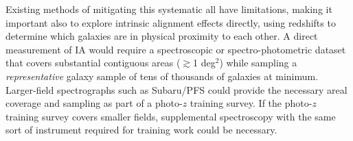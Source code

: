 Existing methods of mitigating this systematic all have limitations, making it important also to
explore intrinsic alignment effects directly, using redshifts to determine
which galaxies are in physical proximity to each other.
A direct measurement of IA would require a spectroscopic or spectro-photometric dataset that covers substantial
contiguous areas ($\gtrsim$1 deg$^2$) while sampling a
{\em representative} galaxy sample of tens of thousands of galaxies at minimum.
Larger-field spectrographs such as Subaru/PFS could provide the necessary areal coverage and sampling as part of a photo-$z$ training survey.  If the photo-$z$ training survey covers smaller fields, supplemental spectroscopy with the same sort of instrument required for training work could be necessary.

